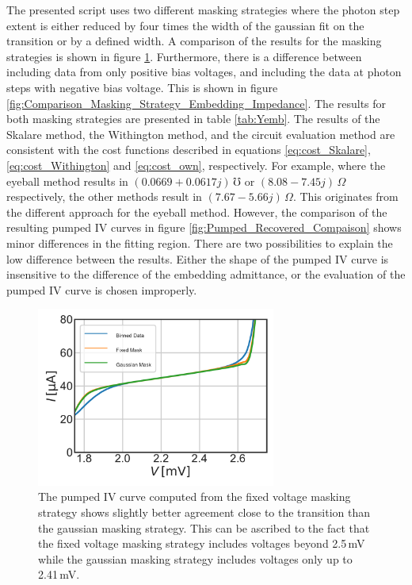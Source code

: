 \documentclass[]{article}
\begin{document}
The presented script uses two different masking strategies where the photon step extent is either reduced by four times the width of the gaussian fit on the transition or by a defined width. A comparison of the results for the masking strategies is shown in figure \ref{fig:Comparison_Masking_Strategy_Gaus_Fixed_Embedding_Impedance}. Furthermore, there is a difference between including data from only positive bias voltages, and including the data at photon steps with negative bias voltage. This is shown in figure \ref{fig:Comparison_Masking_Strategy_Embedding_Impedance}. The results for both masking strategies are presented in table \ref{tab:Yemb}. The results of the Skalare method, the Withington method, and the circuit evaluation method are consistent with the cost functions described in equations \ref{eq:cost_Skalare}, \ref{eq:cost_Withington} and \ref{eq:cost_own}, respectively. For example, where the eyeball method results in $(0.0669 + 0.0617j)\,\mho$ or $(8.08 - 7.45j)\,\Omega$ respectively, the other methods result in $(7.67 - 5.66j)\,\Omega$. This originates from the different approach for the eyeball method. However, the comparison of the resulting pumped IV curves in figure \ref{fig:Pumped_Recovered_Compaison} shows minor differences in the fitting region. There are two possibilities to explain the low difference between the results. Either the shape of the pumped IV curve is insensitive to the difference of the embedding admittance, or the evaluation of the pumped IV curve is chosen improperly. 
\begin{figure}
	\centering
\includegraphics[width=0.7\textwidth]{../Mixer_Unit_Test/2020_01_14_Fixed_Mask/Comparison_Masking_Strategy_Gaus_Fixed_Embedding_Impedance.pdf}
\caption{The pumped IV curve computed from the fixed voltage masking strategy shows slightly better agreement close to the transition than the gaussian masking strategy. This can be ascribed to the fact that the fixed voltage masking strategy includes voltages beyond 2.5\,mV while the gaussian masking strategy includes voltages only up to 2.41\,mV.  }
\label{fig:Comparison_Masking_Strategy_Gaus_Fixed_Embedding_Impedance}
\end{figure}
\end{document}

